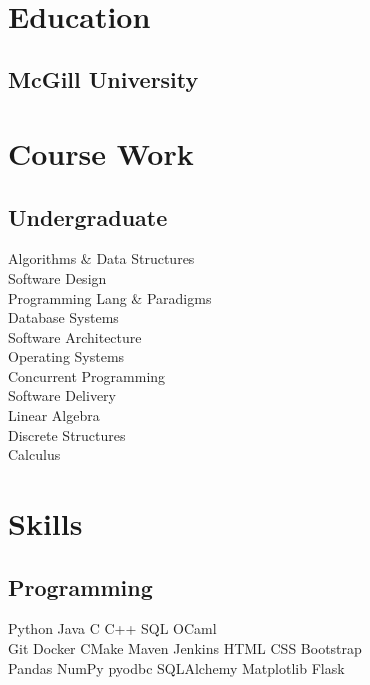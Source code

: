\documentclass[]{willguthrie-resume}
\begin{document}
 
\header

\noindent\makebox[\linewidth]{\rule{0.94\paperwidth}{0.4pt}}

\hspace*{-\parindent}%
\begin{minipage}[t][][b]{0.33\textwidth}~

	\section{Education}
	\subsection{McGill University}
	\sectionsep

	\section{Course Work}
	\subsection{Undergraduate}
	Algorithms \& Data Structures \\
	Software Design \\
	Programming Lang \& Paradigms \\
	Database Systems \\
	Software Architecture \\
	Operating Systems \\
	Concurrent Programming \\
	Software Delivery \\
	Linear Algebra \\
	Discrete Structures \\
	Calculus \\
	\sectionsep

	\section{Skills}
	\subsection{Programming}
	Python \tb Java \tb C \tb C++ \tb SQL \tb OCaml \\
	Git \tb Docker \tb CMake \tb Maven \tb Jenkins \tb HTML \tb CSS \tb Bootstrap \\
	Pandas \tb NumPy \tb pyodbc \tb SQLAlchemy \tb Matplotlib \tb Flask \\
	\sectionsep


\end{minipage}
\end{document}
